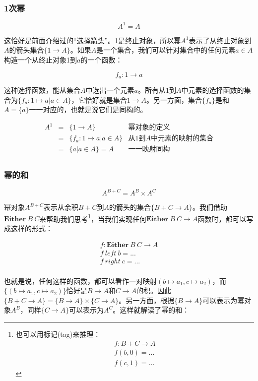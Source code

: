 \documentclass{article}
\begin{document}
\subsubsection{1次幂}

\[
  A^1 = A
\]

这恰好是前面介绍过的“\hyperref[sec:selection-arrow]{选择箭头}”。1是终止对象，所以幂$A^1$表示了从终止对象到$A$的箭头集合$\{ 1 \to A\}$。如果$A$是一个集合，我们可以针对集合中的任何元素$a \in A$构造一个从终止对象1到$a$的一个函数：

\[
  f_a : 1 \to a
\]

这种选择函数，能从集合$A$中选出一个元素$a$。所有从1到$A$中元素的选择函数的集合为$\{f_a : 1 \mapsto a | a \in A\}$，它恰好就是集合$1 \to A$。另一方面，集合$\{ f_a \}$是和$A = \{a\}$一一对应的，也就是说它们是同构的。

\[
\begin{array}{rcll}
A^1 & = & \{ 1 \to A \} & \text{幂对象的定义} \\
    & = & \{ f_a : 1 \mapsto a | a \in A \} & \text{从1到$A$中元素的映射的集合} \\
    & = & \{ a | a \in A \} = A & \text{一一映射同构} \\
\end{array}
\]

\subsubsection{幂的和}

\[
  A^{B + C} = A^B \times A^C
\]

幂对象$A^{B + C}$表示从余积$B + C$到$A$的箭头的集合$\{B + C \to A\}$。我们借助$\mathbf{Either}\ B\ C$来帮助我们思考\footnote{也可以用标记(tag)来推理：
\[
\begin{array}{l}
f : B + C \to A \\
f (b, 0) = ... \\
f (c, 1) = ...
\end{array}
\]
}，当我们实现任何$\mathbf{Either}\ B\ C \to A$函数时，都可以写成这样的形式：

\[
\begin{array}{l}
f : \mathbf{Either}\ B\ C \to A \\
f\ left\ b = ... \\
f\ right\ c = ... \\
\end{array}
\]

也就是说，任何这样的函数，都可以看作一对映射$(b \mapsto a_1, c \mapsto a_2)$，而$\{(b \mapsto a_1, c \mapsto a_2)\}$恰好是$B \to A$和$C \to A$的积。因此$\{B + C \to A\} = \{B \to A\} \times \{C \to A\}$。另一方面，根据$\{B \to A\}$可以表示为幂对象$A^B$，同样$\{C \to A\}$可以表示为$A^C$。这样就解读了幂的和：
\end{document}
